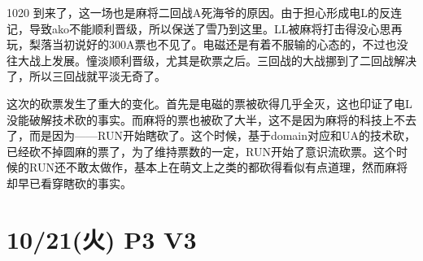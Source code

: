 
1020 到来了，这一场也是麻将二回战A死海爷的原因。由于担心形成电L的反连记，导致ako不能顺利晋级，所以保送了雪乃到这里。LL被麻将打击得没心思再玩，梨落当初说好的300A票也不见了。电磁还是有着不服输的心态的，不过也没往大战上发展。憧淡顺利晋级，尤其是砍票之后。三回战的大战挪到了二回战解决了，所以三回战就平淡无奇了。

这次的砍票发生了重大的变化。首先是电磁的票被砍得几乎全灭，这也印证了电L没能破解技术砍的事实。而麻将的票也被砍了大半，这不是因为麻将的科技上不去了，而是因为——RUN开始瞎砍了。这个时候，基于domain对应和UA的技术砍，已经砍不掉圆麻的票了，为了维持票数的一定，RUN开始了意识流砍票。这个时候的RUN还不敢太做作，基本上在萌文上之类的都砍得看似有点道理，然而麻将却早已看穿瞎砍的事实。

\section{10/21(火) P3 V3}

